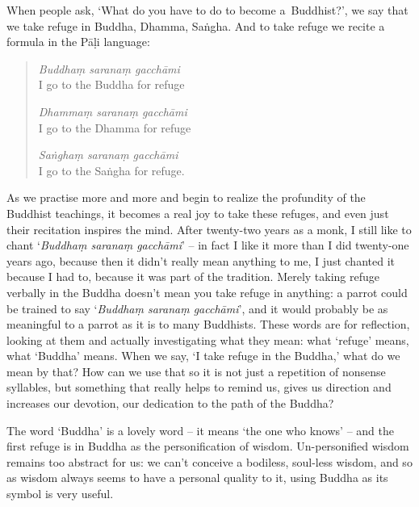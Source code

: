 
When people ask, `What do you have to do to become a\linebreak\ Buddhist?', we say that we take refuge in Buddha, Dhamma, Sa\.ngha. And to take refuge we recite a formula in the P\=a\d{l}i language:

\begin{quote}
\textit{Buddha\d{m} sarana\d{m} gacch\=ami} \\
I go to the Buddha for refuge

\textit{Dhamma\d{m} sarana\d{m} gacch\=ami} \\
I go to the Dhamma for refuge

\textit{Sa\.ngha\d{m} sarana\d{m} gacch\=ami} \\
I go to the Sa\.ngha for refuge.
\end{quote}

As we practise more and more and begin to realize the profundity of the Buddhist teachings, it becomes a real joy to take these refuges, and even just their recitation inspires the mind. After twenty-two years as a monk, I still like to chant `\textit{Buddha\d{m} sarana\d{m} gacch\=ami}' -- in fact I like it more than I did twenty-one years ago, because then it didn't really mean anything to me, I just chanted it because I had to, because it was part of the tradition. Merely taking refuge verbally in the Buddha doesn't mean you take refuge in anything: a parrot could be trained to say `\textit{Buddha\d{m} sarana\d{m} gacch\=ami}', and it would probably be as meaningful to a parrot as it is to many Buddhists. These words are for reflection, looking at them and actually investigating what they mean: what `refuge' means, what `Buddha' means. When we say, `I take refuge in the Buddha,' what do we mean by that? How can we use that so it is not just a repetition of nonsense syllables, but something that really helps to remind us, gives us direction and increases our devotion, our dedication to the path of the Buddha?

The word `Buddha' is a lovely word -- it means `the one who knows' -- and the first refuge is in Buddha as the personification of wisdom. Un-personified wisdom remains too abstract for us: we can't conceive a bodiless, soul-less wisdom, and so as wisdom always seems to have a personal quality to it, using Buddha as its symbol is very useful.


